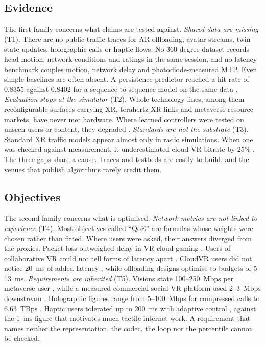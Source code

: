 \subsection{Evidence}
The first family concerns what claims are tested against. \emph{Shared data are missing} (T1). There are
no public traffic traces for AR offloading, avatar streams, twin-state updates, holographic calls or
haptic flows. No 360-degree dataset records head motion, network conditions and ratings in the same
session, and no latency benchmark couples motion, network delay and photodiode-measured MTP. Even simple
baselines are often absent. A persistence predictor reached a hit rate of 0.8355 against 0.8402 for a
sequence-to-sequence model on the same data \cite{W2963428739}. \emph{Evaluation stops at the
simulator} (T2). Whole technology lines, among them reconfigurable surfaces carrying XR, terahertz XR
links and metaverse resource markets, have never met hardware. Where learned controllers were tested on
unseen users or content, they degraded \cite{W4403826584,W4400409717}. \emph{Standards are not the
substrate} (T3). Standard XR traffic models appear almost only in radio simulations. When one was
checked against measurement, it underestimated cloud-VR bitrate by 25\% \cite{W4399340506}. The three
gaps share a cause. Traces and testbeds are costly to build, and the venues that publish algorithms
rarely credit them.

\subsection{Objectives}
The second family concerns what is optimised. \emph{Network metrics are not linked to experience} (T4).
Most objectives called ``QoE'' are formulas whose weights were chosen rather than fitted. Where users
were asked, their answers diverged from the proxies. Packet loss outweighed delay in VR cloud gaming
\cite{W4404916373}. Users of collaborative VR could not tell forms of latency apart \cite{W4392600587}.
CloudVR users did not notice 20~ms of added latency \cite{W2896076858}, while offloading designs optimise
to budgets of 5--13~ms. \emph{Requirements are inherited} (T5). Visions state 100--250~Mbps per metaverse
user \cite{W4313291084,W4312940001}, while a measured commercial social-VR platform used 2--3~Mbps
downstream \cite{W4294643390}. Holographic figures range from 5--100~Mbps for compressed calls
\cite{W4312662428} to 6.63~TBps \cite{W4300960574}. Haptic users tolerated up to 200~ms with adaptive
control \cite{W4200154132}, against the 1~ms figure that motivates much tactile-internet work. A
requirement that names neither the representation, the codec, the loop nor the percentile cannot be
checked.

